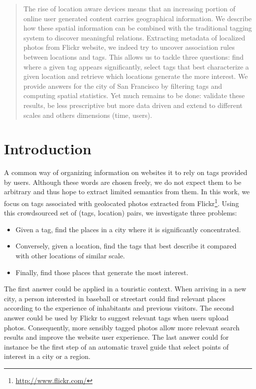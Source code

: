 \begin{abstract}

	The rise of location aware devices means that an increasing portion of
	online user generated content carries geographical information. We
	describe how these spatial information can be combined with the
	traditional tagging system to discover meaningful relations. Extracting
	metadata of localized photos from Flickr website, we indeed try to uncover
	association rules between locations and tags. This allows us to tackle
	three questions: find where a given tag appears significantly, select tags
	that best characterize a given location and retrieve which locations
	generate the more interest. We provide answers for the city of San
	Francisco by filtering tags and computing spatial statistics. Yet much
	remains to be done: validate these results, be less prescriptive but more
	data driven and extend to different scales and others dimensions (time,
	users).

\end{abstract}

\section{Introduction}

A common way of organizing information on websites it to rely on tags provided
by users. Although these words are chosen freely, we do not expect them to be
arbitrary and thus hope to extract limited semantics from them. In this work,
we focus on tags associated with geolocated photos extracted from
Flickr\footnote{\href{https://secure.flickr.com/}{http://www.flickr.com/}}.
Using this crowdsourced set of (tags, location) pairs, we investigate three
problems:

\begin{itemize}
	\item Given a tag, find the places in a city where it is significantly
		concentrated.
	\item Conversely, given a location, find the tags that best describe it
		compared with other locations of similar scale.
	\item Finally, find those places that generate the most interest.
\end{itemize}

The first answer could be applied in a touristic context. When arriving in a
new city, a person interested in \textsf{baseball} or \textsf{streetart} could
find relevant places according to the experience of inhabitants and previous
visitors. The second answer could be used by Flickr to suggest relevant tags
when users upload photos. Consequently, more sensibly tagged photos allow more
relevant search results and improve the website user experience. The last
answer could for instance be the first step of an automatic travel guide that
select points of interest in a city or a region.

